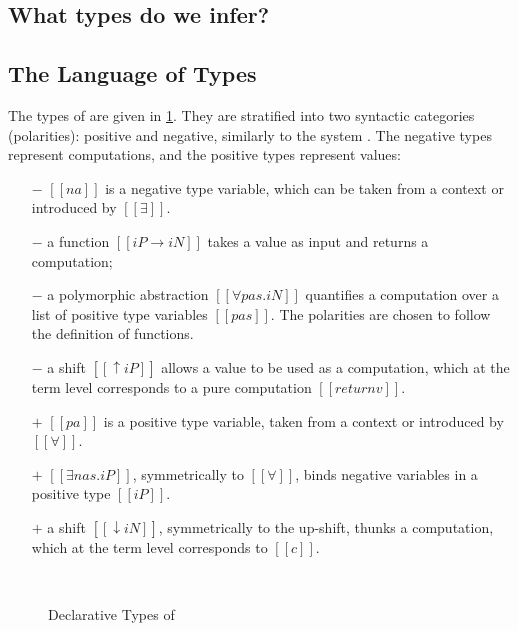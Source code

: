 \subsection{What types do we infer?}


\subsection{The Language of Types}

The types of \fexists are given in \cref{fig:declarative-types}.
They are stratified into two syntactic 
categories (polarities): positive and negative,  
similarly to the \CBPV system \cite{levy2006:cbpv}.
The negative types represent computations, and the positive types represent values:
\begin{itemize}
\item [$-$] $[[na]]$ is a negative type variable, which can be taken from a context or introduced by $[[∃]]$.
\item [$-$] a function $[[iP → iN]]$ takes a value as input and returns a computation; 
\item [$-$] a polymorphic abstraction $[[∀pas.iN]]$ quantifies a computation over
  a list of positive type variables 
  $[[pas]]$. The polarities are chosen to follow the definition of functions.
\item [$-$] a shift $[[↑iP]]$ allows a value to be used as a computation, 
  which at the term level corresponds to a pure computation $[[return v]]$.
\item [$+$] $[[pa]]$ is a positive type variable, taken from a context or introduced by $[[∀]]$.
\item [$+$] $[[∃nas.iP]]$, symmetrically to $[[∀]]$, 
  binds negative variables in a positive type $[[iP]]$. 
\item [$+$] a shift $[[↓iN]]$, symmetrically to the up-shift, 
  thunks a computation, which at the term level corresponds to $[[ {c} ]]$.
\end{itemize}

\begin{figure}[h]
  \begin{multicols}{2}
    \ottgrammartabular{
      \ottiN\ottinterrule
    }\\
    \ottgrammartabular{
      \ottiP\ottinterrule
    }
    \columnbreak
  \end{multicols}
  \caption{Declarative Types of \fexists}
  \label{fig:declarative-types}
\end{figure}

